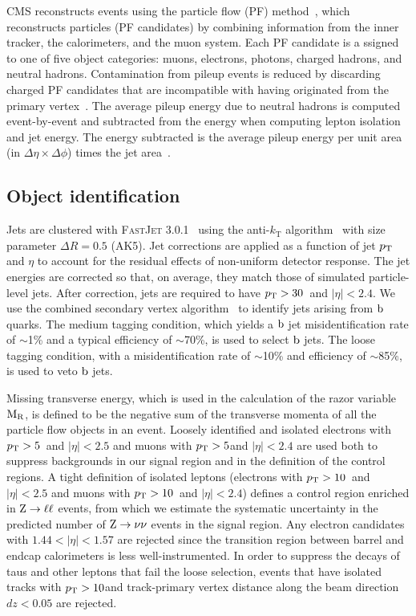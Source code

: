 CMS reconstructs events using the particle flow (PF) method~\cite{PF}, which reconstructs particles
(PF candidates) by combining information from the inner tracker, the calorimeters, and the muon
system.  Each PF candidate is a ssigned to one of five object categories: muons, electrons, photons,
charged hadrons, and neutral hadrons.  Contamination from pileup events is reduced by discarding
charged PF candidates that are incompatible with having originated from the primary
vertex~\cite{CMS-PAS-JME-14-001}.   The average pileup energy due to neutral hadrons is computed
event-by-event and subtracted from the energy when computing lepton isolation and jet energy.  The
energy subtracted is  the average pileup energy per unit area (in $\Delta\eta \times \Delta\phi$)
times the jet area~\cite{Fastjet1, Fastjet2}.

\subsection{Object identification}

Jets are clustered with \textsc{FastJet 3.0.1}~\cite{Cacciari:2011ma} using the anti-$k_\textrm{T}$
algorithm~\cite{antikt} with size parameter $\Delta R=0.5$ (AK5).  Jet corrections are applied as a
function of jet $p_{\mathrm{T}}$ and $\eta$ to account for the residual effects of non-uniform detector
response.  
The  jet energies are corrected so that, on average, they match those of simulated particle-level
jets. After correction, jets are required to have $p_{\mathrm{T}} > 30$~\GeV and $|\eta| < 2.4$.  We use the
combined secondary vertex algorithm~\cite{btag7TeV,btag8TeV} to identify jets arising from $\mathrm{b}$
quarks. The medium tagging condition, which yields a $\mathrm{b}$  jet misidentification rate of
$\sim$1\% and a typical efficiency of $\sim$70\%, is used to select $\mathrm{b}$ jets. The loose tagging
condition, with a misidentification rate of $\sim$10\% and efficiency of $\sim$85\%, is used to veto
$\mathrm{b}$ jets.  

Missing transverse energy, which is used in the calculation of the razor variable $\mathrm{M_R}$, is 
defined to be the negative sum of the transverse momenta of all the particle flow objects in an
event.  Loosely identified and isolated electrons with $p_{\mathrm{T}} > 5$~\GeV and $|\eta| < 2.5$ and muons
with $p_{\mathrm{T}} > 5$\GeV and $|\eta| < 2.4$ are used both to suppress backgrounds in our signal region and
in the definition of the control regions.  A tight definition of isolated leptons (electrons with
$p_{\mathrm{T}} > 10$~\GeV and $|\eta| < 2.5$ and muons with $p_{\mathrm{T}} > 10$~\GeV and $|\eta| < 2.4$) defines a
control region enriched in $\mathrm{Z} \rightarrow \ell \ell $ events, from which we estimate the
systematic uncertainty in the predicted number of $\mathrm{Z} \rightarrow \nu \nu$ events in the signal
region. Any electron candidates with $1.44 < |\eta| < 1.57$ are rejected since the transition region
between barrel and endcap calorimeters is less well-instrumented.
In order to suppress the decays of taus and other leptons that fail the loose selection, events that
have isolated tracks with $p_{\mathrm{T}} > 10$\GeV and track-primary vertex distance along the beam direction
$dz < 0.05$ are rejected.

